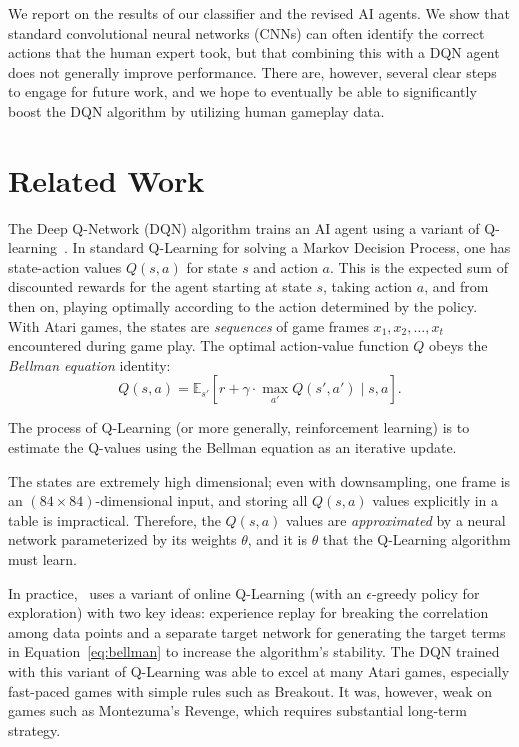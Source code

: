 \documentclass[letterpaper, 10pt, conference]{ieeeconf}
\begin{document}
We report on the results of our classifier and the revised AI agents. We show
that standard convolutional neural networks (CNNs) can often identify the
correct actions that the human expert took, but that combining this with a DQN
agent does not generally improve performance. There are, however, several clear
steps to engage for future work, and we hope to eventually be able to
significantly boost the DQN algorithm by utilizing human gameplay data.




\section{Related Work}\label{sec:related_work}

The Deep Q-Network (DQN) algorithm trains an AI agent using a variant of
Q-learning~\cite{Sutton_1998}. In standard Q-Learning for solving a Markov
Decision Process, one has state-action values $Q(s,a)$ for state $s$ and action
$a$. This is the expected sum of discounted rewards for the agent starting at
state $s$, taking action $a$, and from then on, playing optimally according to
the action determined by the policy.  With Atari games, the states are
\emph{sequences} of game frames $x_1,x_2,\ldots,x_t$ encountered during game
play. The optimal action-value function $Q$ obeys the \emph{Bellman equation}
identity: 
\begin{equation}\label{eq:bellman}
Q(s,a) = \mathbb{E}_{s'}\left[r + \gamma \cdot \max_{a'} Q(s',a') \mid s,a \right].
\end{equation}

The process of Q-Learning (or more generally, reinforcement learning) is to
estimate the Q-values using the Bellman equation as an iterative update.

The states are extremely high dimensional; even with downsampling, one frame is
an $(84\times 84)$-dimensional input, and storing all $Q(s,a)$ values explicitly
in a table is impractical.  Therefore, the $Q(s,a)$ values are
\emph{approximated} by a neural network parameterized by its weights $\theta$,
and it is $\theta$ that the Q-Learning algorithm must learn.

In practice,~\cite{mnih-dqn-2015} uses a variant of online Q-Learning (with an
$\epsilon$-greedy policy for exploration) with two key ideas: experience replay
for breaking the correlation among data points and a separate target network
for generating the target terms in Equation~\ref{eq:bellman} to increase the
algorithm's stability. The DQN trained with this variant of Q-Learning was able
to excel at many Atari games, especially fast-paced games with simple rules such
as Breakout. It was, however, weak on games such as Montezuma's Revenge, which
requires substantial long-term strategy.
\end{document}
